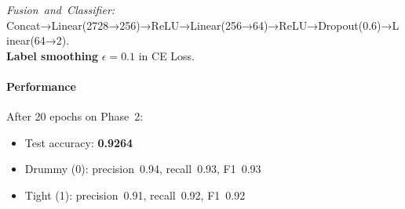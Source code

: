 \documentclass{article}
\begin{document}
\textit{Fusion and Classifier:} Concat→Linear(2728→256)→ReLU→Linear(256→64)→ReLU→Dropout(0.6)→Linear(64→2).\\

\textbf{Label smoothing} \(\epsilon=0.1\) in CE Loss.\\

\paragraph{Performance}
After 20 epochs on Phase 2:
\begin{itemize}
  \item Test accuracy: \textbf{0.9264}
  \item Drummy (0): precision 0.94, recall 0.93, F1 0.93
  \item Tight (1): precision 0.91, recall 0.92, F1 0.92
\end{itemize}
\end{document}
